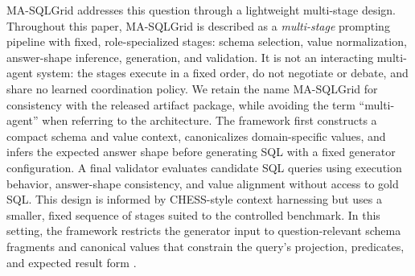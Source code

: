 \documentclass[cmc,article,submit,moreauthors,pdftex]{Definitions/tsp}
\begin{document}
MA-SQLGrid addresses this question through a lightweight multi-stage design. Throughout this paper, MA-SQLGrid is described as a \emph{multi-stage} prompting pipeline with fixed, role-specialized stages: schema selection, value normalization, answer-shape inference, generation, and validation. It is not an interacting multi-agent system: the stages execute in a fixed order, do not negotiate or debate, and share no learned coordination policy. We retain the name MA-SQLGrid for consistency with the released artifact package, while avoiding the term ``multi-agent'' when referring to the architecture. The framework first constructs a compact schema and value context, canonicalizes domain-specific values, and infers the expected answer shape before generating SQL with a fixed generator configuration. A final validator evaluates candidate SQL queries using execution behavior, answer-shape consistency, and value alignment without access to gold SQL. This design is informed by CHESS-style context harnessing \cite{talaei2024chess} but uses a smaller, fixed sequence of stages suited to the controlled benchmark. In this setting, the framework restricts the generator input to question-relevant schema fragments and canonical values that constrain the query's projection, predicates, and expected result form \cite{wu2022chains,xie2022unifiedskg,li2024select}.
\end{document}
